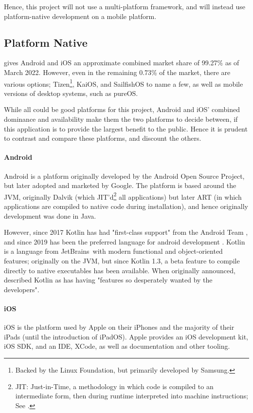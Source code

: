 \documentclass[11pt, a4paper, notitlepage]{report}
\begin{document}
Hence, this project will not use a multi-platform framework, and will instead use platform-native development on a mobile platform.

\subsection{Platform Native}
\citet{MobileMarketShare} gives Android and iOS an approximate combined market share of 99.27\% as of March 2022. However, even in the remaining 0.73\% of the market, there are various options; Tizen\footnote{Backed by the Linux Foundation, but primarily developed by Samsung.}, KaiOS, and SailfishOS to name a few, as well as mobile versions of desktop systems, such as pureOS.

While all could be good platforms for this project, Android and iOS' combined dominance and availability make them the two platforms to decide between, if this application is to provide the largest benefit to the public. Hence it is prudent to contrast and compare these platforms, and discount the others.

\paragraph{Android} Android is a platform originally developed by the Android Open Source Project, but later adopted and marketed by Google. The platform is based around the JVM, originally Dalvik (which JIT'd\footnote{JIT: Just-in-Time, a methodology in which code is compiled to an intermediate form, then during runtime interpreted into machine instructions; See \citet{JITHistory}.} all applications) but later ART (in which applications are compiled to native code during installation), and hence originally development was done in Java.

However, since 2017 Kotlin has had "first-class support" from the Android Team \citep{KotlinPreferred}, and since 2019 has been the preferred language for android development \citep{KotlinFirst}. Kotlin is a language from JetBrains\texttrademark\, with modern functional and object-oriented features; originally on the JVM, but since Kotlin 1.3, a beta feature to compile directly to native executables has been available. When originally announced, \citet{KotlinAnnounced} described Kotlin as has having "features so desperately wanted by the developers".

\paragraph{iOS} iOS is the platform used by Apple on their iPhones and the majority of their iPads (until the introduction of iPadOS). Apple provides an iOS development kit, iOS SDK, and an IDE, XCode, as well as documentation and other tooling.
\end{document}
